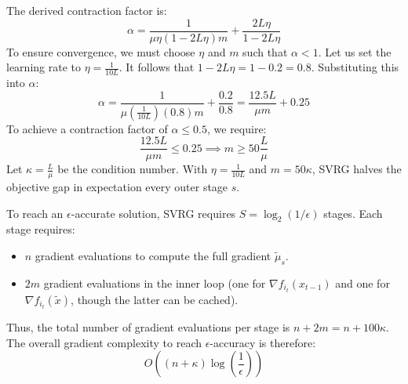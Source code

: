 \documentclass[11pt]{article}
\begin{document}
The derived contraction factor is:
\begin{equation}
    \alpha = \frac{1}{\mu\eta(1 - 2L\eta)m} + \frac{2L\eta}{1 - 2L\eta}
\end{equation}
To ensure convergence, we must choose $\eta$ and $m$ such that $\alpha < 1$. 
Let us set the learning rate to $\eta = \frac{1}{10L}$. It follows that $1 - 2L\eta = 1 - 0.2 = 0.8$. Substituting this into $\alpha$:
\begin{equation}
    \alpha = \frac{1}{\mu \left(\frac{1}{10L}\right) (0.8) m} + \frac{0.2}{0.8} = \frac{12.5 L}{\mu m} + 0.25
\end{equation}
To achieve a contraction factor of $\alpha \leq 0.5$, we require:
\begin{equation}
    \frac{12.5 L}{\mu m} \leq 0.25 \implies m \geq 50 \frac{L}{\mu}
\end{equation}
Let $\kappa = \frac{L}{\mu}$ be the condition number. With $\eta = \frac{1}{10L}$ and $m = 50\kappa$, SVRG halves the objective gap in expectation every outer stage $s$.

To reach an $\epsilon$-accurate solution, SVRG requires $S = \log_2(1/\epsilon)$ stages. Each stage requires:
\begin{itemize}
    \item $n$ gradient evaluations to compute the full gradient $\tilde{\mu}_s$.
    \item $2m$ gradient evaluations in the inner loop (one for $\nabla f_{i_t}(x_{t-1})$ and one for $\nabla f_{i_t}(\tilde{x})$, though the latter can be cached).
\end{itemize}
Thus, the total number of gradient evaluations per stage is $n + 2m = n + 100\kappa$. The overall gradient complexity to reach $\epsilon$-accuracy is therefore:
\begin{equation}
    O\left((n + \kappa) \log\left(\frac{1}{\epsilon}\right)\right)
\end{equation}
\end{document}
